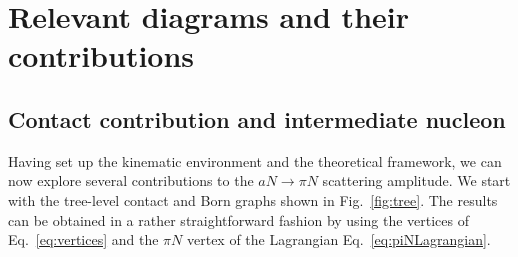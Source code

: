 \documentclass[reprint,amssymb,amsmath,floatfix,aps,prd,groupedaddress,nofootinbib]{revtex4-2}
\begin{document}
\section{Relevant diagrams and their contributions}\label{sec:amplitudes}
\subsection{Contact contribution and intermediate nucleon}\label{ssec:treeaN}

Having set up the kinematic environment and the theoretical framework, we can now explore 
several contributions to the $aN\to \pi N$ scattering amplitude. We start with the tree-level
contact and Born graphs shown in Fig.~\ref{fig:tree}. The results can be obtained in a rather
straightforward fashion by using the vertices of Eq.~\eqref{eq:vertices} and the $\pi N$ vertex of
the Lagrangian Eq.~\eqref{eq:piNLagrangian}.
\begin{figure*}[t]
\qquad
{}\qquad
{}
\caption{Tree level contributions to $aN\to \pi N$ without the $\Delta$ intermediate state.}
\label{fig:tree}
\end{figure*}
\end{document}
